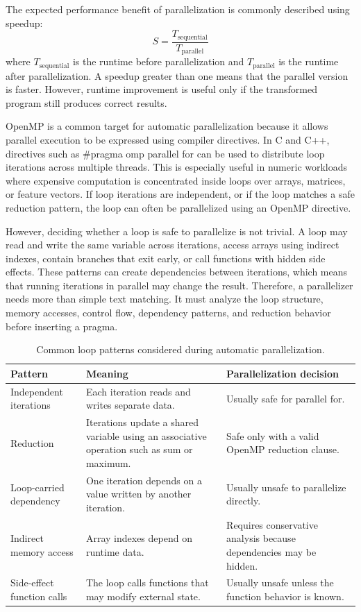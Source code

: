 \documentclass[12pt,a4paper,oneside]{report}
\begin{document}
The expected performance benefit of parallelization is commonly described using
speedup:
\[
S = \frac{T_{\text{sequential}}}{T_{\text{parallel}}}
\]
where \(T_{\text{sequential}}\) is the runtime before parallelization and
\(T_{\text{parallel}}\) is the runtime after parallelization. A speedup greater
than one means that the parallel version is faster. However, runtime improvement
is useful only if the transformed program still produces correct results.

OpenMP is a common target for automatic parallelization because it allows
parallel execution to be expressed using compiler directives. In C and C++,
directives such as \#pragma omp parallel for can be used to distribute
loop iterations across multiple threads. This is especially useful in numeric
workloads where expensive computation is concentrated inside loops over arrays,
matrices, or feature vectors. If loop iterations are independent, or if the loop
matches a safe reduction pattern, the loop can often be parallelized using an
OpenMP directive.

However, deciding whether a loop is safe to parallelize is not trivial. A loop
may read and write the same variable across iterations, access arrays using
indirect indexes, contain branches that exit early, or call functions with hidden
side effects. These patterns can create dependencies between iterations, which
means that running iterations in parallel may change the result. Therefore, a
parallelizer needs more than simple text matching. It must analyze the loop
structure, memory accesses, control flow, dependency patterns, and reduction
behavior before inserting a pragma.

\begin{table}[H]
\centering
\normalsize
\renewcommand{\arraystretch}{1.08}
\setlength{\tabcolsep}{5pt}
\caption{Common loop patterns considered during automatic parallelization.}
\label{tab:parallelization-loop-patterns}
\begin{tabularx}{\textwidth}{p{}XX}
\toprule
\textbf{Pattern} & \textbf{Meaning} & \textbf{Parallelization decision} \\
\midrule
Independent iterations &
Each iteration reads and writes separate data. &
Usually safe for parallel for. \\
\midrule
Reduction &
Iterations update a shared variable using an associative operation such as sum
or maximum. &
Safe only with a valid OpenMP reduction clause. \\
\midrule
Loop-carried dependency &
One iteration depends on a value written by another iteration. &
Usually unsafe to parallelize directly. \\
\midrule
Indirect memory access &
Array indexes depend on runtime data. &
Requires conservative analysis because dependencies may be hidden. \\
\midrule
Side-effect function calls &
The loop calls functions that may modify external state. &
Usually unsafe unless the function behavior is known. \\
\bottomrule
\end{tabularx}
\end{table}
\end{document}
